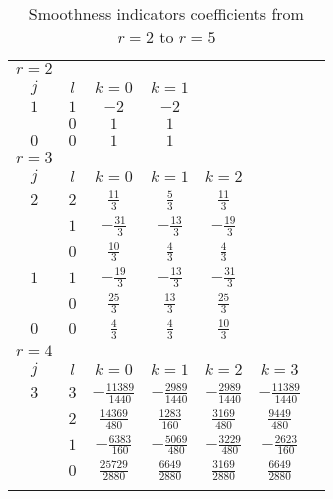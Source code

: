 \begin{table}
  \begin{center}
    \caption{Smoothness indicators coefficients from $r=2$ to $r=5$}
    \label{tab:IS_2-5}
    \begin{tabular}{ccccccc}
      \toprule
      $r=2$  \\
      $j$  &  $l$  &  $k=0$ &  $k=1$ \\ \addlinespace
      $1$  &  $1$  &  $-2$  &  $-2$  \\ \addlinespace
           &  $0$  &  $ 1$  &  $ 1$  \\ \addlinespace
      $0$  &  $0$  &  $ 1$  &  $ 1$  \\ \addlinespace
      \midrule
      $r=3$  \\
      $j$  &  $l$  &  $k=0$            &  $k=1$            &  $k=2$            \\ \addlinespace
      $2$  &  $2$  &  $ \frac{11}{3}$  &  $ \frac{ 5}{3}$  &  $ \frac{11}{3}$  \\ \addlinespace
           &  $1$  &  $-\frac{31}{3}$  &  $-\frac{13}{3}$  &  $-\frac{19}{3}$  \\ \addlinespace
           &  $0$  &  $ \frac{10}{3}$  &  $ \frac{ 4}{3}$  &  $ \frac{ 4}{3}$  \\ \addlinespace
      $1$  &  $1$  &  $-\frac{19}{3}$  &  $-\frac{13}{3}$  &  $-\frac{31}{3}$  \\ \addlinespace
           &  $0$  &  $ \frac{25}{3}$  &  $ \frac{13}{3}$  &  $ \frac{25}{3}$  \\ \addlinespace
      $0$  &  $0$  &  $ \frac{ 4}{3}$  &  $ \frac{ 4}{3}$  &  $ \frac{10}{3}$  \\ \addlinespace
      \midrule
      $r=4$  \\
      $j$  &  $l$  &  $k=0$                  &  $k=1$                  &  $k=2$                  &  $k=3$                  \\ \addlinespace
      $3$  &  $3$  &  $-\frac{11389}{1440}$  &  $-\frac{ 2989}{1440}$  &  $-\frac{ 2989}{1440}$  &  $-\frac{11389}{1440}$  \\ \addlinespace
           &  $2$  &  $ \frac{14369}{ 480}$  &  $ \frac{ 1283}{ 160}$  &  $ \frac{ 3169}{ 480}$  &  $ \frac{ 9449}{ 480}$  \\ \addlinespace
           &  $1$  &  $-\frac{ 6383}{ 160}$  &  $-\frac{ 5069}{ 480}$  &  $-\frac{ 3229}{ 480}$  &  $-\frac{ 2623}{ 160}$  \\ \addlinespace
           &  $0$  &  $ \frac{25729}{2880}$  &  $ \frac{ 6649}{2880}$  &  $ \frac{ 3169}{2880}$  &  $ \frac{ 6649}{2880}$  \\ \addlinespace

\end{tabular}
\end{center}
\end{table}
